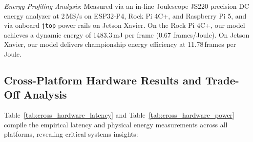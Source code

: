 \documentclass[journal,twoside,web]{ieeecolor}
\begin{document}
\begin{table}[t]
{\begin{tabular}{llccccccc}
\bottomrule
\end{tabular}%
}
\vspace{1ex}
{\raggedright \footnotesize \textit{Energy Profiling Analysis}: Measured via an in-line Joulescope JS220 precision DC energy analyzer at 2\,MS/s on ESP32-P4, Rock Pi 4C+, and Raspberry Pi 5, and via onboard \texttt{jtop} power rails on Jetson Xavier. On the Rock Pi 4C+, our model achieves a dynamic energy of 1483.3\,mJ per frame (0.67 frames/Joule). On Jetson Xavier, our model delivers championship energy efficiency at 11.78\,frames per Joule.\par}
\end{table}

\subsection{Cross-Platform Hardware Results and Trade-Off Analysis}
Table~\ref{tab:cross_hardware_latency} and Table~\ref{tab:cross_hardware_power} compile the empirical latency and physical energy measurements across all platforms, revealing critical systems insights:
\end{document}

